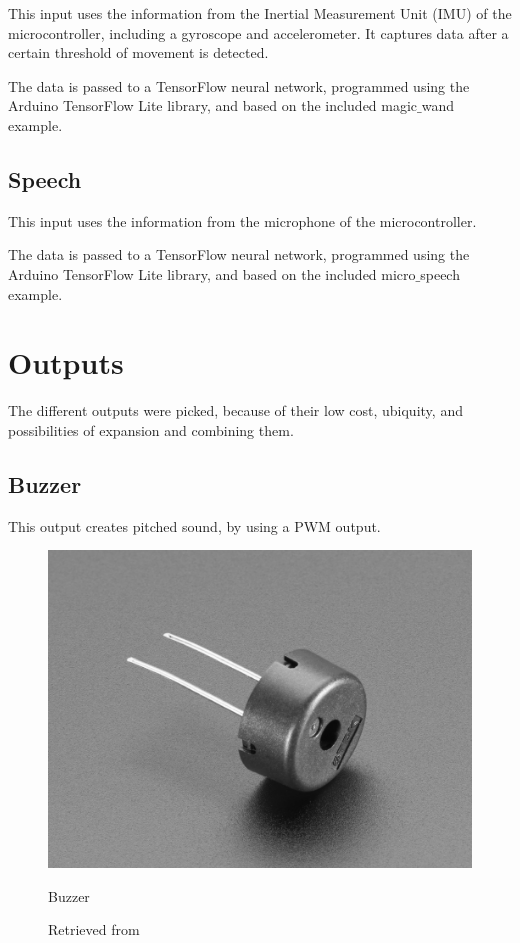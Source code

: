 This input uses the information from the Inertial Measurement Unit (IMU) of the microcontroller, including a gyroscope and accelerometer. It captures data after a certain threshold of movement is detected.

The data is passed to a TensorFlow neural network, programmed using the Arduino TensorFlow Lite library, and based on the included magic$\_$wand example.

\subsection{Speech}

This input uses the information from the microphone of the microcontroller.

The data is passed to a TensorFlow neural network, programmed using the Arduino TensorFlow Lite library, and based on the included micro$\_$speech example.

\section{Outputs}

The different outputs were picked, because of their low cost, ubiquity, and possibilities of expansion and combining them.

\subsection{Buzzer}

This output creates pitched sound, by using a PWM output.

\begin{figure}[ht]
  \centering
  \includegraphics[width=0.75\linewidth,height=0.25\textheight,keepaspectratio]{images/materials-adafruit-buzzer.jpg}
  \caption{Buzzer}
  \caption*{Retrieved from \cite{website-materials-adafruit-buzzer}}
  \label{fig:materials-adafruit-buzzer}
\end{figure}

